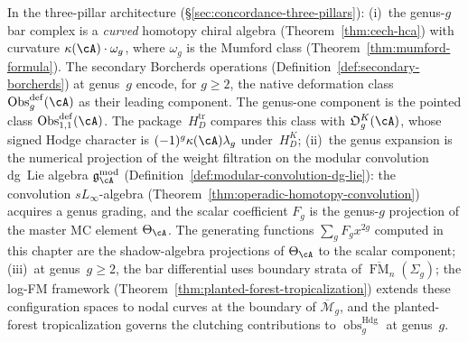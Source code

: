 \begin{remark}

In the three-pillar architecture
(\S\ref{sec:concordance-three-pillars}):
(i)~the genus-$g$ bar complex is a \emph{curved} homotopy chiral
algebra (Theorem~\ref{thm:cech-hca}) with curvature
$\kappa(\cA) \cdot \omega_g$, where $\omega_g$ is the Mumford class
(Theorem~\ref{thm:mumford-formula}). The secondary Borcherds
operations (Definition~\ref{def:secondary-borcherds}) at genus~$g$
encode, for $g\geq2$, the native deformation class
$\operatorname{Obs}^{\mathrm{def}}_g(\cA)$ as their leading component.
The genus-one component is the pointed class
$\operatorname{Obs}^{\mathrm{def}}_{1,1}(\cA)$.
The package~$H_D^{\mathrm{tr}}$ compares this class with
$\mathfrak O_g^K(\cA)$, whose signed Hodge character is
$(-1)^g\kappa(\cA)\lambda_g$ under~$H_D^K$;
(ii)~the genus expansion is the numerical projection of the weight
filtration on the
modular convolution dg~Lie algebra $\mathfrak{g}^{\mathrm{mod}}_\cA$
(Definition~\ref{def:modular-convolution-dg-lie}):
the convolution $sL_\infty$-algebra
(Theorem~\ref{thm:operadic-homotopy-convolution}) acquires a
genus grading, and the scalar coefficient $F_g$ is the
genus-$g$ projection of the master MC element $\Theta_\cA$.
The generating functions $\sum_g F_g x^{2g}$ computed in this
chapter are the shadow-algebra projections of
$\Theta_\cA$ to the scalar component;
(iii)~at genus~$g \geq 2$, the bar differential uses boundary strata
of $\overline{\operatorname{FM}}_n(\Sigma_g)$; the log-FM framework
(Theorem~\ref{thm:planted-forest-tropicalization}) extends these
configuration spaces to nodal curves at the boundary of
$\overline{\mathcal{M}}_g$, and the planted-forest tropicalization
governs the clutching contributions to
$\operatorname{obs}^{\mathrm{Hdg}}_g$ at genus~$g$.
\end{remark}

